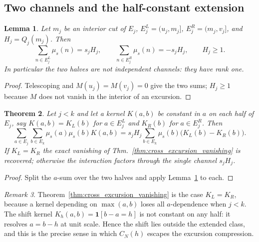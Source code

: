 \documentclass[11pt]{amsart}
\numberwithin{equation}{section}
\theoremstyle{plain}
\newtheorem{theorem}{Theorem}[section]
\newtheorem{lemma}[theorem]{Lemma}
\theoremstyle{definition}
\theoremstyle{remark}
\newtheorem{remark}[theorem]{Remark}
\begin{document}
\subsection{Two channels and the half-constant extension}
\label{subsec:two_channels}

\begin{lemma}
\label{lem:two_channels}
Let $m_j$ be an interior cut of $E_j$, $E_j^{L}=(u_j,m_j]$,
$E_j^{R}=(m_j,v_j]$, and $H_j=Q_j(m_j)$. Then
\begin{equation}
\sum_{n\in E_j^{L}}\mu_s(n)=s_jH_j,
\qquad
\sum_{n\in E_j^{R}}\mu_s(n)=-s_jH_j,
\qquad H_j\ge1 .
\label{eq:two_channels}
\end{equation}
In particular the two halves are not independent channels: they have
rank one.
\end{lemma}

\begin{proof}
Telescoping and $M(u_j)=M(v_j)=0$ give the two sums; $H_j\ge1$ because
$M$ does not vanish in the interior of an excursion.
\end{proof}

\begin{theorem}
\label{thm:half_constant_blindness}
Let $j<k$ and let a kernel $K(a,b)$ be constant in $a$ on each half of
$E_j$, say $K(a,b)=K_L(b)$ for $a\in E_j^L$ and $K_R(b)$ for
$a\in E_j^R$. Then
\begin{equation}
\sum_{a\in E_j}\sum_{b\in E_k}\mu_s(a)\mu_s(b)K(a,b)
= s_jH_j\sum_{b\in E_k}\mu_s(b)\bigl(K_L(b)-K_R(b)\bigr).
\label{eq:half_constant_blindness}
\end{equation}
If $K_L=K_R$ the exact vanishing of
Thm.~\ref{thm:cross_excursion_vanishing} is recovered; otherwise the
interaction factors through the single channel $s_jH_j$.
\end{theorem}

\begin{proof}
Split the $a$-sum over the two halves and apply
Lemma~\ref{lem:two_channels} to each.
\end{proof}

\begin{remark}
\label{rem:shift_escapes}
Theorem~\ref{thm:cross_excursion_vanishing} is the case $K_L=K_R$,
because a kernel depending on $\max(a,b)$ loses all $a$-dependence when
$j<k$. The shift kernel $K_h(a,b)=\mathbf 1[b-a=h]$ is not constant on
any half: it resolves $a=b-h$ at unit scale. Hence the shift lies
outside the extended class, and this is the precise sense in which
$C_N(h)$ escapes the excursion compression.
\end{remark}
\end{document}
